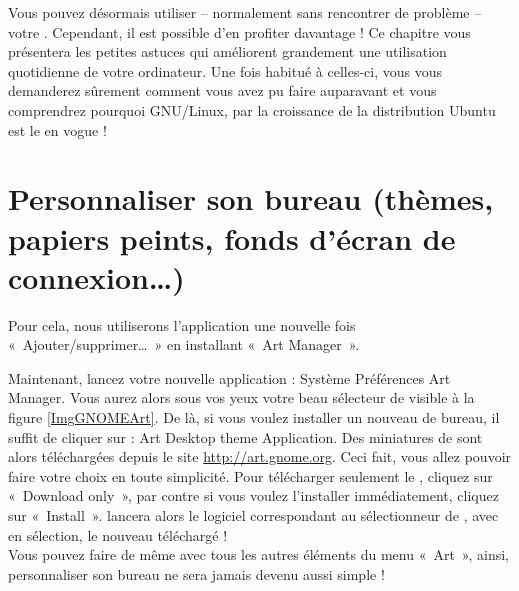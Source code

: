  {Vous pouvez désormais utiliser}{ -- normalement sans rencontrer de problème -- votre . Cependant, il est possible d'en profiter davantage ! Ce chapitre vous présentera les petites astuces qui améliorent grandement une utilisation quotidienne de votre ordinateur. Une fois habitué à celles-ci, vous vous demanderez sûrement comment vous avez pu faire auparavant et vous comprendrez pourquoi GNU/Linux, par la croissance de la distribution Ubuntu est le  en vogue !}
\label{ChapitreMieuxUtiliserGnome}
\section{Personnaliser son bureau (thèmes, papiers peints, fonds d'écran de connexion\ldots{})}
\label{RefInstallTheme}
Pour cela, nous utiliserons l'application une nouvelle fois «~Ajouter/supprimer\dots{}~» en installant «~Art Manager~».\par
{}
Maintenant, lancez votre nouvelle application : Système \FlecheDroite Préférences \FlecheDroite Art Manager. Vous aurez alors sous vos yeux votre beau sélecteur de  visible à la figure \ref{ImgGNOMEArt}. De là, si vous voulez installer un nouveau  de bureau, il suffit de cliquer sur : Art \FlecheDroite Desktop theme \FlecheDroite Application. Des miniatures de  sont alors téléchargées depuis le site \url{http://art.gnome.org}. Ceci fait, vous allez pouvoir faire votre choix en toute simplicité. Pour télécharger seulement le , cliquez sur «~Download only~», par contre si vous voulez l'installer immédiatement, cliquez sur «~Install~».  lancera alors le logiciel correspondant au sélectionneur de , avec en sélection, le nouveau  téléchargé !\\
Vous pouvez faire de même avec tous les autres éléments du menu «~Art~», ainsi, personnaliser son bureau ne sera jamais devenu aussi simple !
